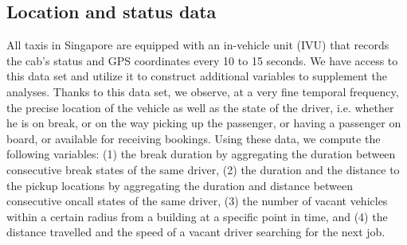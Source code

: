 \documentclass[reviewmode,AEJ]{AEA}
\begin{document}



\subsection{Location and status data}
All taxis in Singapore are equipped with an in-vehicle unit (IVU) that records the cab's status and GPS 
coordinates every 10 to 15 seconds. We have access to this data set and utilize it to construct additional variables to supplement the analyses. Thanks to this data set, we observe, at a very fine temporal frequency, the precise location of the vehicle as well as the state of the driver, i.e. whether he is on break, or on the way picking up the passenger, or having a passenger on board, or available for receiving bookings. Using these data, we compute the following variables: (1) the break duration by aggregating the duration between consecutive break states of the same driver, (2) the duration and  the distance to the pickup locations by aggregating the duration and distance between consecutive oncall states of the same driver, (3) the number of vacant vehicles within a certain radius from a building at a specific point in time, and (4) the distance travelled and the speed of a vacant driver searching for the next job. 
\end{document}
